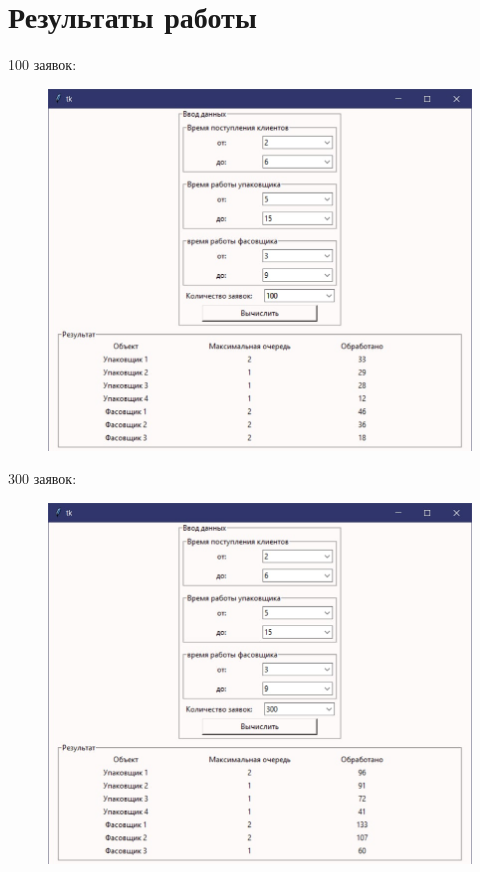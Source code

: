 \documentclass[16pt]{report}
\begin{document}
\chapter{Результаты работы}
{\Large100 заявок:}
\begin{figure}[h]
	\centering
	\includegraphics[scale=0.8]{1.jpg}
	\label{fig:screenshot001}
\end{figure}
\newpage
{\Large300 заявок:}
\begin{figure}[h]
	\centering
	\includegraphics[scale=0.8]{2.jpg}
	\label{fig:screenshot001}
\end{figure}
\end{document}
